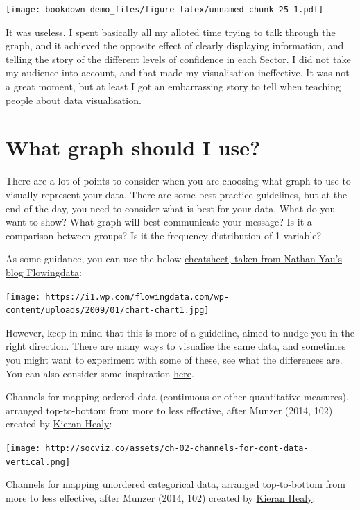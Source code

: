 \documentclass[]{book}
\theoremstyle{definition}
\theoremstyle{definition}
\theoremstyle{definition}
\theoremstyle{remark}
\begin{document}
\texttt{[image: bookdown-demo\_files/figure-latex/unnamed-chunk-25-1.pdf]}

It was useless. I spent basically all my alloted time trying to talk
through the graph, and it achieved the opposite effect of clearly
displaying information, and telling the story of the different levels of
confidence in each Sector. I did not take my audience into account, and
that made my visualisation ineffective. It was not a great moment, but
at least I got an embarrassing story to tell when teaching people about
data visualisation.

\hypertarget{what-graph-should-i-use}{%
\section{What graph should I use?}\label{what-graph-should-i-use}}

There are a lot of points to consider when you are choosing what graph
to use to visually represent your data. There are some best practice
guidelines, but at the end of the day, you need to consider what is best
for your data. What do you want to show? What graph will best
communicate your message? Is it a comparison between groups? Is it the
frequency distribution of 1 variable?

As some guidance, you can use the below
\href{https://flowingdata.com/2009/01/15/flow-chart-shows-you-what-chart-to-use/}{cheatsheet,
taken from Nathan Yau's blog Flowingdata}:

\texttt{[image: https://i1.wp.com/flowingdata.com/wp-content/uploads/2009/01/chart-chart1.jpg]}

However, keep in mind that this is more of a guideline, aimed to nudge
you in the right direction. There are many ways to visualise the same
data, and sometimes you might want to experiment with some of these, see
what the differences are. You can also consider some inspiration
\href{http://datavizproject.com/}{here}.

Channels for mapping ordered data (continuous or other quantitative
measures), arranged top-to-bottom from more to less effective, after
Munzer (2014, 102) created by \href{http://socviz.co/}{Kieran Healy}:

\texttt{[image: http://socviz.co/assets/ch-02-channels-for-cont-data-vertical.png]}

Channels for mapping unordered categorical data, arranged top-to-bottom
from more to less effective, after Munzer (2014, 102) created by
\href{http://socviz.co/}{Kieran Healy}:
\end{document}
